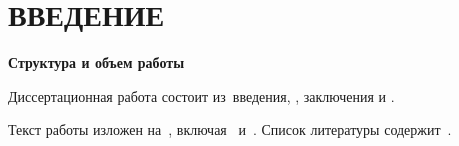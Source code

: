 \chapter*{ВВЕДЕНИЕ}                         

\newcommand{\actuality}{\textbf{\actualityTXT}}
\newcommand{\progress}{\textbf{\progressTXT}}
\newcommand{\aim}{{\textbf\aimTXT}}
\newcommand{\tasks}{\textbf{\tasksTXT}}
\newcommand{\novelty}{\textbf{\noveltyTXT}}
\newcommand{\influence}{\textbf{\influenceTXT}}
\newcommand{\methods}{\textbf{\methodsTXT}}
\newcommand{\defpositions}{\textbf{\defpositionsTXT}}
\newcommand{\reliability}{\textbf{\reliabilityTXT}}
\newcommand{\probation}{\textbf{\probationTXT}}
\newcommand{\contribution}{\textbf{\contributionTXT}}
\newcommand{\pasport}{\textbf{\pasportTXT}}
\newcommand{\publications}{\textbf{\publicationsTXT}}

 

\textbf{Структура и объем работы} 

Диссертационная работа состоит из~введения, , заключения и .

Текст работы изложен на~, включая~ и~. Список литературы содержит~.